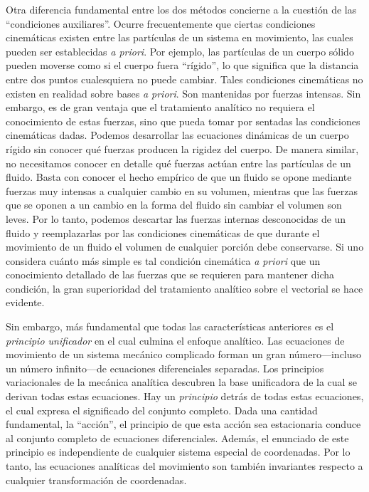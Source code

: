 \documentclass[12pt,a4paper]{book}
\begin{document}
Otra diferencia fundamental entre los dos m\'etodos concierne a la cuesti\'on de las ``condiciones auxiliares''. Ocurre frecuentemente que ciertas condiciones cinem\'aticas existen entre las part\'iculas de un sistema en movimiento, las cuales pueden ser establecidas \textit{a priori}. Por ejemplo, las part\'iculas de un cuerpo s\'olido pueden moverse como si el cuerpo fuera ``r\'igido'', lo que significa que la distancia entre dos puntos cualesquiera no puede cambiar. Tales condiciones cinem\'aticas no existen en realidad sobre bases \textit{a priori}. Son mantenidas por fuerzas intensas. Sin embargo, es de gran ventaja que el tratamiento anal\'itico no requiera el conocimiento de estas fuerzas, sino que pueda tomar por sentadas las condiciones cinem\'aticas dadas. Podemos desarrollar las ecuaciones din\'amicas de un cuerpo r\'igido sin conocer qu\'e fuerzas producen la rigidez del cuerpo. De manera similar, no necesitamos conocer en detalle qu\'e fuerzas act\'uan entre las part\'iculas de un fluido. Basta con conocer el hecho emp\'irico de que un fluido se opone mediante fuerzas muy intensas a cualquier cambio en su volumen, mientras que las fuerzas que se oponen a un cambio en la forma del fluido sin cambiar el volumen son leves. Por lo tanto, podemos descartar las fuerzas internas desconocidas de un fluido y reemplazarlas por las condiciones cinem\'aticas de que durante el movimiento de un fluido el volumen de cualquier porci\'on debe conservarse. Si uno considera cu\'anto m\'as simple es tal condici\'on cinem\'atica \textit{a priori} que un conocimiento detallado de las fuerzas que se requieren para mantener dicha condici\'on, la gran superioridad del tratamiento anal\'itico sobre el vectorial se hace evidente.

Sin embargo, m\'as fundamental que todas las caracter\'isticas anteriores es el \textit{principio unificador} en el cual culmina el enfoque anal\'itico. Las ecuaciones de movimiento de un sistema mec\'anico complicado forman un gran n\'umero---incluso un n\'umero infinito---de ecuaciones diferenciales separadas. Los principios variacionales de la mec\'anica anal\'itica descubren la base unificadora de la cual se derivan todas estas ecuaciones. Hay un \textit{principio} detr\'as de todas estas ecuaciones, el cual expresa el significado del conjunto completo. Dada una cantidad fundamental, la ``acci\'on'', el principio de que esta acci\'on sea estacionaria conduce al conjunto completo de ecuaciones diferenciales. Adem\'as, el enunciado de este principio es independiente de cualquier sistema especial de coordenadas. Por lo tanto, las ecuaciones anal\'iticas del movimiento son tambi\'en invariantes respecto a cualquier transformaci\'on de coordenadas.
\end{document}
